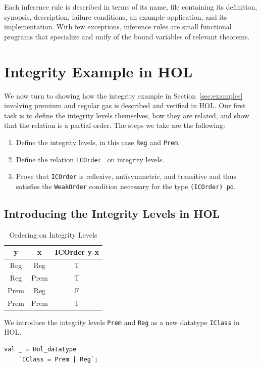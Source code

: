 Each inference rule is described in terms of its name, file containing
its definition, synopsis, description, failure conditions, an example
application, and its implementation. With few exceptions, inference
rules are small functional programs that specialize and unify of the
bound variables of relevant theorems.

\chapter{Integrity Example in HOL}
\label{cha:integrity-example}
We now turn to showing how the integrity example in
Section~\ref{sec:examples} involving premium and regular gas is
described and verified in HOL. Our first task is to define the
integrity levels themselves, how they are related, and show that the
relation is a partial order. The steps we take are the following:
\begin{enumerate}
\item Define the integrity levels, in this case \texttt{Reg} and
  \texttt{Prem}.
\item Define the relation \texttt{ICOrder } on integrity levels.
\item Prove that \texttt{ICOrder} is reflexive, antisymmetric, and
  transitive and thus satisfies the \texttt{WeakOrder} condition
  necessary for the type \texttt{(ICOrder) po}.
\end{enumerate}

\section{Introducing the Integrity Levels in HOL}
\begin{table}[t]
  \centering
  \begin{tabular}{cc|c}
    \textbf{y} & \textbf{x} & \textbf{ICOrder y x}\\
    \hline
    Reg & Reg & T\\
    Reg & Prem & T\\
    Prem & Reg & F\\
    Prem & Prem & T
  \end{tabular}
  \caption{Ordering on Integrity Levels}
  \label{tab:ICOrder}
\end{table}

We introduce the integrity levels \texttt{Prem} and \texttt{Reg} as a new datatype \texttt{IClass} in HOL.
\begin{session}
\begin{verbatim}
val _ = Hol_datatype
    `IClass = Prem | Reg`;
\end{verbatim}
\end{session}

